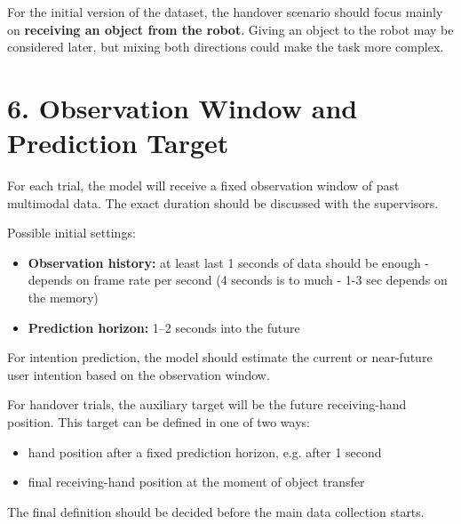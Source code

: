 \documentclass[11pt,a4paper]{article}
\begin{document}
For the initial version of the dataset, the handover scenario should focus mainly on \textbf{receiving an object from the robot}. Giving an object to the robot may be considered later, but mixing both directions could make the task more complex.

\section*{6. Observation Window and Prediction Target}

For each trial, the model will receive a fixed observation window of past multimodal data. The exact duration should be discussed with the supervisors.

Possible initial settings:
\begin{itemize}
    \item \textbf{Observation history:} at least last 1 seconds of data should be enough - depends on frame rate per second (4 seconds is to much - 1-3 sec depends on the memory)
    \item \textbf{Prediction horizon:} 1--2 seconds into the future
\end{itemize}

For intention prediction, the model should estimate the current or near-future user intention based on the observation window.

For handover trials, the auxiliary target will be the future receiving-hand position. This target can be defined in one of two ways:

\begin{itemize}
    \item hand position after a fixed prediction horizon, e.g. after 1 second
    \item final receiving-hand position at the moment of object transfer
\end{itemize}

The final definition should be decided before the main data collection starts.
\end{document}
